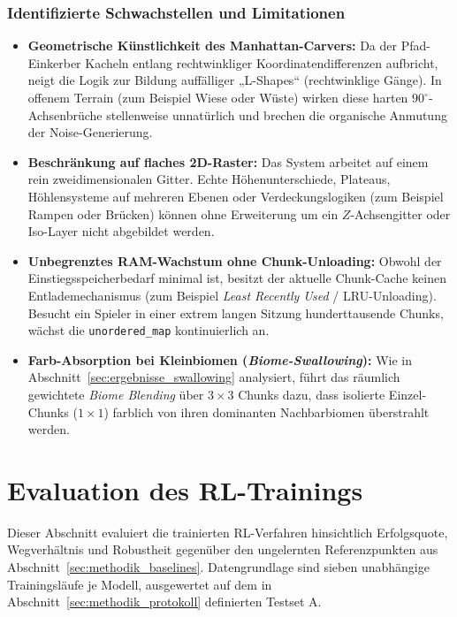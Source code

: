 \documentclass[
  a4paper,
  11pt,
  twoside,
  BCOR=8mm,           %
  headings=big,
  numbers=noenddot,
  listof=totoc,       %
  captions=tableheading,
]{scrreprt}
\begin{document}
\subsubsection{Identifizierte Schwachstellen und Limitationen}
\begin{itemize}
    \item \textbf{Geometrische Künstlichkeit des Manhattan-Carvers:} Da der Pfad-Einkerber Kacheln entlang rechtwinkliger Koordinatendifferenzen aufbricht, neigt die Logik zur Bildung auffälliger „L-Shapes“ (rechtwinklige Gänge). In offenem Terrain (zum Beispiel Wiese oder Wüste) wirken diese harten $90^\circ$-Achsenbrüche stellenweise unnatürlich und brechen die organische Anmutung der Noise-Generierung.
    \item \textbf{Beschränkung auf flaches 2D-Raster:} Das System arbeitet auf einem rein zweidimensionalen Gitter. Echte Höhenunterschiede, Plateaus, Höhlensysteme auf mehreren Ebenen oder Verdeckungslogiken (zum Beispiel Rampen oder Brücken) können ohne Erweiterung um ein $Z$-Achsengitter oder Iso-Layer nicht abgebildet werden.
    \item \textbf{Unbegrenztes RAM-Wachstum ohne Chunk-Unloading:} Obwohl der Einstiegsspeicherbedarf minimal ist, besitzt der aktuelle Chunk-Cache keinen Entlademechanismus (zum Beispiel \textit{Least Recently Used} / LRU-Unloading). Besucht ein Spieler in einer extrem langen Sitzung hunderttausende Chunks, wächst die \texttt{unordered\_map} kontinuierlich an.
    \item \textbf{Farb-Absorption bei Kleinbiomen (\textit{Biome-Swallowing}):} Wie in Abschnitt~\ref{sec:ergebnisse_swallowing} analysiert, führt das räumlich gewichtete \textit{Biome Blending} über $3 \times 3$ Chunks dazu, dass isolierte Einzel-Chunks ($1 \times 1$) farblich von ihren dominanten Nachbarbiomen überstrahlt werden.
\end{itemize}

\section{Evaluation des RL-Trainings}
\label{sec:evalRL}

Dieser Abschnitt evaluiert die trainierten RL-Verfahren hinsichtlich Erfolgsquote, Wegverhältnis und Robustheit gegenüber den ungelernten Referenzpunkten aus Abschnitt~\ref{sec:methodik_baselines}. Datengrundlage sind sieben unabhängige Trainingsläufe je Modell, ausgewertet auf dem in Abschnitt~\ref{sec:methodik_protokoll} definierten Testset A.
\end{document}
